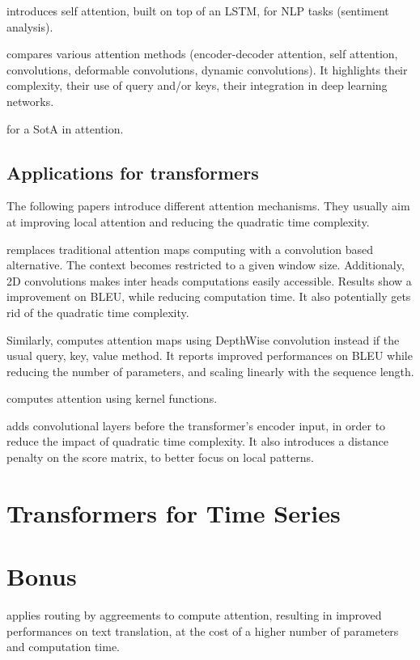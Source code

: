\documentclass{article}
\begin{document}
    \cite{Cheng2016LongSM} introduces self attention, built on top of an LSTM, for NLP tasks (sentiment analysis).

    \cite{Zhu2019AnES} compares various attention methods (encoder-decoder attention, self attention, convolutions, deformable convolutions, dynamic convolutions). It highlights their complexity, their use of query and/or keys, their integration in deep learning networks.

    \cite{weng2018attention} for a SotA in attention.

    \subsection{Applications for transformers}
    The following papers introduce different attention mechanisms. They usually aim at improving local attention and reducing the quadratic time complexity.

    \cite{Yang2019ConvolutionalSN} remplaces traditional attention maps computing with a convolution based alternative. The context becomes restricted to a given window size. Additionaly, 2D convolutions makes inter heads computations easily accessible. Results show a improvement on BLEU, while reducing computation time. It also potentially gets rid of the quadratic time complexity.

    Similarly, \cite{Wu2019PayLA} computes attention maps using DepthWise convolution instead if the usual query, key, value method. It reports improved performances on BLEU while reducing the number of parameters,
    and scaling linearly with the sequence length.

    \cite{Tsai2019TransformerDA} computes attention using kernel functions.
    
    \cite{Gangi2019AdaptingTT} adds convolutional layers before the transformer's encoder input, in order to reduce the impact of quadratic time complexity. It also introduces a distance penalty on the score matrix, to better focus on local patterns.
    

\section{Transformers for Time Series}

\section{Bonus}

    \cite{Li2019InformationAF} applies routing by aggreements to compute attention, resulting in improved performances on text translation, at the cost of a higher number of parameters and computation time.




\end{document}
